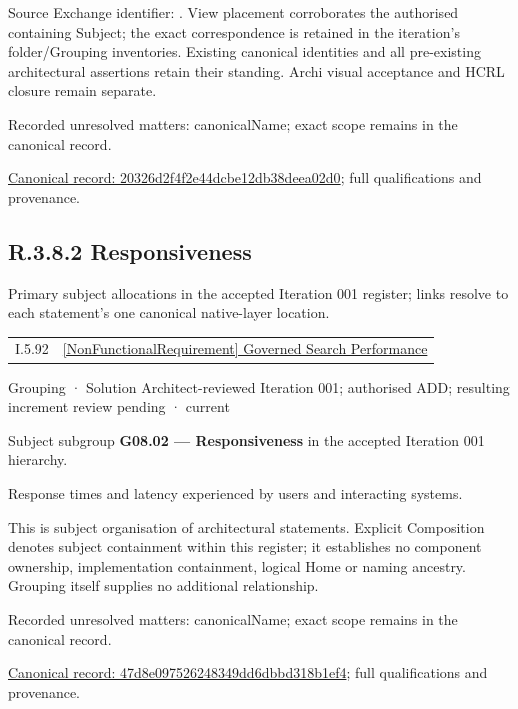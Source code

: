Source Exchange identifier: \texttt{}. View placement corroborates
the authorised containing Subject; the exact correspondence is retained in the
iteration's folder/Grouping inventories. Existing canonical identities and all
pre-existing architectural assertions retain their standing. Archi visual
acceptance and HCRL closure remain separate.


{\small Recorded unresolved matters: canonicalName; exact scope remains in the canonical record.}\par
{\footnotesize \href{../../../../continuum/grouping/20326d2f4f2e44dcbe12db38deea02d0.md}{Canonical record: 20326d2f4f2e44dcbe12db38deea02d0}; full qualifications and provenance.}\par
\subsection*{R.3.8.2 Responsiveness}
\label{navigation:R.3.8.2}

Primary subject allocations in the accepted Iteration 001 register; links resolve to each statement’s one canonical native-layer location.\par
\begin{longtable}{p{.22\linewidth}p{.73\linewidth}}
I.5.92 & \hyperref[element:b29075c844cf403fb1322b4d1aba8803]{[NonFunctionalRequirement] Governed Search Performance} \\
\end{longtable}
\label{element:47d8e097526248349dd6dbbd318b1ef4}
{\small Grouping · Solution Architect-reviewed Iteration 001; authorised ADD; resulting increment review pending · current}\par

Subject subgroup \textbf{G08.02 — Responsiveness} in the accepted Iteration 001 hierarchy.



Response times and latency experienced by users and interacting systems.



This is subject organisation of architectural statements. Explicit Composition denotes subject containment within this register; it establishes no component ownership, implementation containment, logical Home or naming ancestry. Grouping itself supplies no additional relationship.


{\small Recorded unresolved matters: canonicalName; exact scope remains in the canonical record.}\par
{\footnotesize \href{../../../../continuum/grouping/47d8e097526248349dd6dbbd318b1ef4.md}{Canonical record: 47d8e097526248349dd6dbbd318b1ef4}; full qualifications and provenance.}\par
